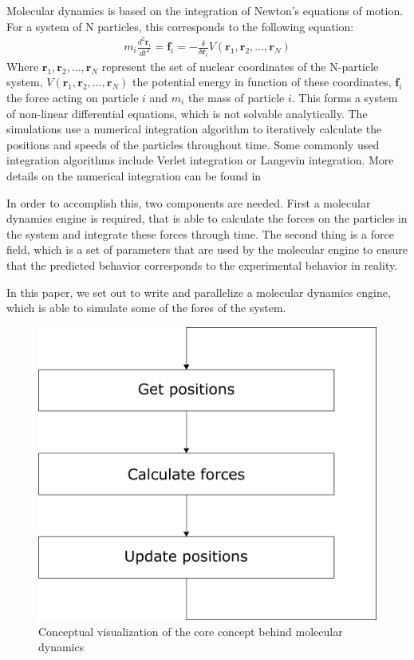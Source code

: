 \documentclass[conference]{IEEEtran}
\begin{document}
Molecular dynamics is based on the integration of Newton's equations of motion. For a system of N particles, this
 corresponds to the following equation:
\begin{align}
    m_i \frac{d^2\mathbf{r}_i}{dt^2} = \mathbf{f}_i = -\frac{\delta}{\delta \mathbf{r}_i}V(\mathbf{r}_1,\mathbf{r}_2,\ldots,\mathbf{r}_N)
\end{align}
Where $\mathbf{r}_1,\mathbf{r}_2,\ldots,\mathbf{r}_N$ represent the set of nuclear coordinates of the N-particle system, 
$V(\mathbf{r}_1,\mathbf{r}_2,\ldots,\mathbf{r}_N)$ the potential energy in function of these coordinates, $\mathbf{f}_i$
the force acting on particle $i$ and $m_i$ the mass of particle $i$. This forms a system of non-linear differential 
equations, which is not solvable analytically. The simulations use a numerical integration algorithm to iteratively
calculate the positions and speeds of the particles throughout time. Some commonly used integration algorithms
include Verlet integration or Langevin integration. More details on the numerical integration can be found in 


In order to accomplish this, two components are needed. First a
molecular dynamics engine is required, that is able to calculate the forces on the particles in the system and
integrate these forces through time. The second thing is a force field, which is a set of parameters that are
used by the molecular engine to ensure that the predicted behavior corresponds to the experimental behavior in reality.

In this paper, we set out to write and parallelize a molecular dynamics engine, which is able to simulate some of the
fores of the system.

\begin{figure}[H]
    \centering
    \includegraphics[width=0.7\linewidth]{images/verlet_concept.png}
    \caption{Conceptual visualization of the core concept behind molecular dynamics}
\end{figure}
\end{document}
